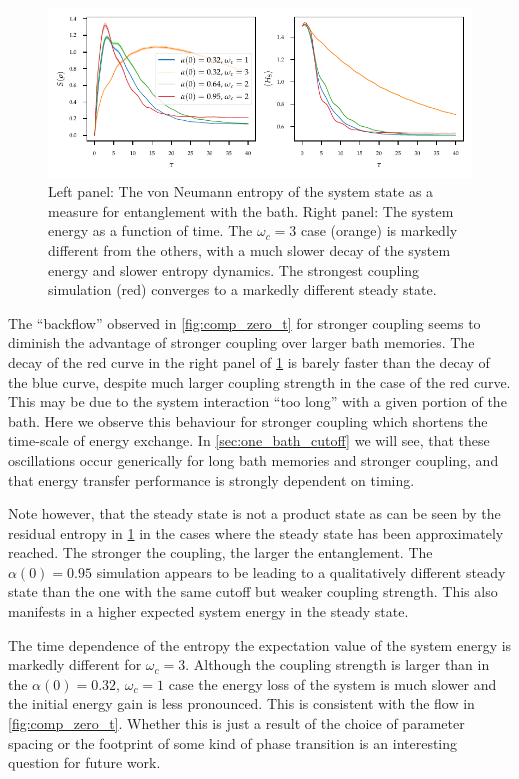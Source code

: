 \begin{figure}[htp]
  \centering
  \includegraphics{figs/analytic_comp/entropy_zero.pdf}
  \caption{\label{fig:ho_zero_entropy} Left panel: The von Neumann
    entropy of the system state as a measure for entanglement with the
    bath. Right panel: The system energy as a function of time. The
    \(ω_{c}=3\) case (orange) is markedly different from the others,
    with a much slower decay of the system energy and slower entropy
    dynamics. The strongest coupling simulation (red) converges to a
    markedly different steady state.}
\end{figure}
The ``backflow'' observed in \cref{fig:comp_zero_t} for stronger
coupling seems to diminish the advantage of stronger coupling over
larger bath memories. The decay of the red curve in the right panel of
\cref{fig:ho_zero_entropy} is barely faster than the decay of the blue
curve, despite much larger coupling strength in the case of the red
curve. This may be due to the system interaction ``too long'' with a
given portion of the bath. Here we observe this behaviour for stronger
coupling which shortens the time-scale of energy exchange. In
\cref{sec:one_bath_cutoff} we will see, that these oscillations occur
generically for long bath memories and stronger coupling, and that
energy transfer performance is strongly dependent on timing.

Note however, that the steady state is not a product state as can be
seen by the residual entropy in \cref{fig:ho_zero_entropy} in the
cases where the steady state has been approximately reached. The
stronger the coupling, the larger the entanglement. The \(α(0)=0.95\)
simulation appears to be leading to a qualitatively different steady
state than the one with the same cutoff but weaker coupling
strength. This also manifests in a higher expected system energy in
the steady state.

The time dependence of the entropy the expectation value of the system
energy is markedly different for \(ω_c=3\). Although the coupling
strength is larger than in the \(α(0)=0.32,\, ω_c=1\) case the energy
loss of the system is much slower and the initial energy gain is less
pronounced. This is consistent with the flow in
\cref{fig:comp_zero_t}. Whether this is just a result of the choice of
parameter spacing or the footprint of some kind of phase transition is
an interesting question for future work.

